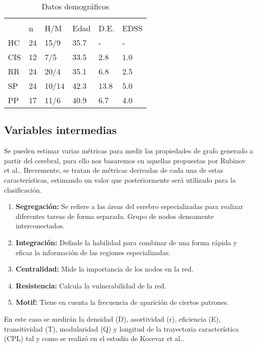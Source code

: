 \documentclass[fleqn,10pt]{UICArticle} %
\begin{document}
\begin{table}[hbt]
\caption{Datos demográficos}
\centering
\begin{tabular}{llllll}
\toprule
\multicolumn{6}{l}{} \\
     & n   & H/M    & Edad  & D.E.  & EDSS  \\
HC   & 24  & 15/9   & 35.7  & -     & -     \\
CIS  & 12  & 7/5    & 33.5  & 2.8   & 1.0   \\
RR   & 24  & 20/4   & 35.1  & 6.8   & 2.5   \\
SP   & 24  & 10/14  & 42.3  & 13.8  & 5.0   \\
PP   & 17  & 11/6   & 40.9  & 6.7   & 4.0   \\
\bottomrule
\end{tabular}
\label{tab:label}
\end{table}

\subsection{Variables intermedias}
Se pueden estimar varias métricas para medir las propiedades de grafo generado a partir del cerebral, para ello nos basaremos en aquellas propuestas por Rubinov et al.\cite{Rubinov2010}. Brevemente, se tratan de métricas derivadas de cada una de estas características, estimando un valor que posteriormente será utilizado para la clasificación.

\begin{enumerate}[noitemsep]
\item \textbf{Segregación:} Se refiere a las áreas del cerebro especializadas para realizar diferentes tareas de forma separada. Grupo de nodos densamente interconectados.
\item \textbf{Integración:} Definde la habilidad para combinar de una forma rápida y eficaz la información de las regiones especializadas.
\item \textbf{Centralidad:} Mide la importancia de los nodos en la red.
\item \textbf{Resistencia:} Calcula la vulnerabilidad de la red.
\item \textbf{Motif:} Tiene en cuenta la frecuencia de aparición de ciertos patrones.
\end{enumerate}

En este caso se medirán la densidad (D), asortividad (r), eficiencia (E), transitividad (T), modularidad (Q) y longitud de la trayectoria característica (CPL) tal y como se realizó en el estudio de Kocevar et al.\cite{Kocevar2016}.
\end{document}
